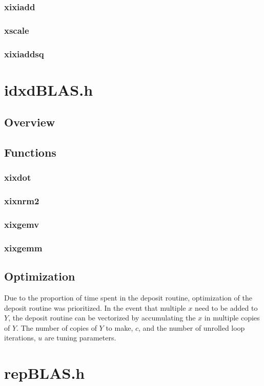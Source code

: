 \documentclass[12pt]{article}
\theoremstyle{plain}
\begin{document}
    \subsubsection{xixiadd}
    \subsubsection{xscale}
    \subsubsection{xixiaddsq}
\section{idxdBLAS.h}
  \subsection{Overview}
  \subsection{Functions}
    \subsubsection{xixdot}
    \subsubsection{xixnrm2}
    \subsubsection{xixgemv}
    \subsubsection{xixgemm}
  \subsection{Optimization}
    Due to the proportion of time spent in the deposit routine, optimization of the deposit routine was prioritized. In the event that multiple $x$ need to be added to $Y$, the deposit routine can be vectorized by accumulating the $x$ in multiple copies of $Y$. The number of copies of $Y$ to make, $c$, and the number of unrolled loop iterations, $u$ are tuning parameters.
\section{repBLAS.h}
\end{document}
